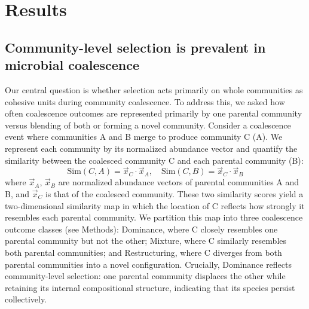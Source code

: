 \section{Results}
\label{sec:results}



\subsection{Community-level selection is prevalent in microbial coalescence}
\label{sec:results:dominance_prevalent}

Our central question is whether selection acts primarily on whole communities as cohesive units during community coalescence. To address this, we asked how often coalescence outcomes are represented primarily by one parental community versus blending of both or forming a novel community. Consider a coalescence event where communities A and B merge to produce community C (A). We represent each community by its normalized abundance vector and quantify the similarity between the coalesced community C and each parental community (B):
\begin{equation}
\text{Sim}(C, A) = \vec{x}_C \cdot \vec{x}_A, \quad \text{Sim}(C, B) = \vec{x}_C \cdot \vec{x}_B
\label{eq:similarity}
\end{equation}
where $\vec{x}_A$, $\vec{x}_B$ are normalized abundance vectors of parental communities A and B, and $\vec{x}_C$ is that of the coalesced community. These two similarity scores yield a two-dimensional similarity map in which the location of C reflects how strongly it resembles each parental community. We partition this map into three coalescence outcome classes (see Methods): Dominance, where C closely resembles one parental community but not the other; Mixture, where C similarly resembles both parental communities; and Restructuring, where C diverges from both parental communities into a novel configuration. Crucially, Dominance reflects community-level selection: one parental community displaces the other while retaining its internal compositional structure, indicating that its species persist collectively.

